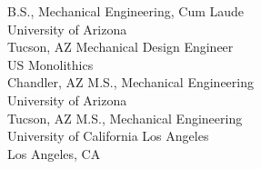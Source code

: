  {B.S., Mechanical Engineering, Cum Laude\\ University of Arizona\\ Tucson, AZ}
 {Mechanical Design Engineer \\ US Monolithics \\ Chandler, AZ}
 {M.S., Mechanical Engineering \\ University of Arizona \\ Tucson, AZ}
 {M.S., Mechanical Engineering \\ University of California Los Angeles \\ Los Angeles, CA}




